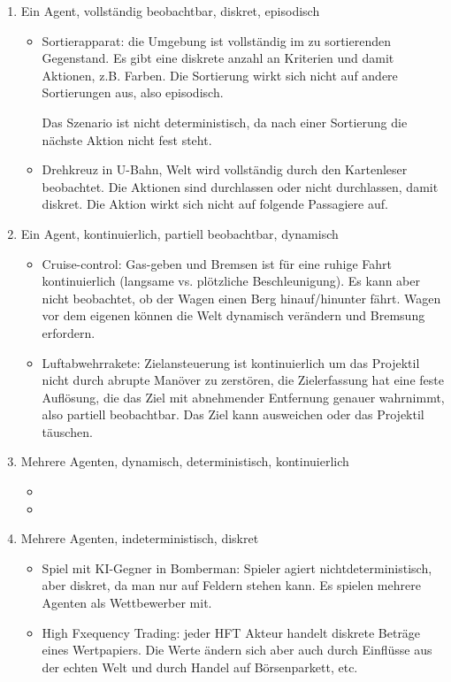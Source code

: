 \begin{enumerate}[label=\alph*)]
	\item Ein Agent, vollständig beobachtbar, diskret, episodisch
	\begin{itemize}
		\item Sortierapparat: die Umgebung ist vollständig im zu sortierenden Gegenstand. Es gibt eine diskrete anzahl an Kriterien und damit Aktionen, z.B. Farben. Die Sortierung wirkt sich nicht auf andere Sortierungen aus, also episodisch.
		
		Das Szenario ist nicht deterministisch, da nach einer Sortierung die nächste Aktion nicht fest steht.
		
		\item Drehkreuz in U-Bahn, Welt wird vollständig durch den Kartenleser beobachtet. Die Aktionen sind durchlassen oder nicht durchlassen, damit diskret. Die Aktion wirkt sich nicht auf folgende Passagiere auf.
	\end{itemize}
	
	\item Ein Agent, kontinuierlich, partiell beobachtbar, dynamisch
	\begin{itemize}
		\item Cruise-control: Gas-geben und Bremsen ist für eine ruhige Fahrt kontinuierlich (langsame vs. plötzliche Beschleunigung). Es kann aber nicht beobachtet, ob der Wagen einen Berg hinauf/hinunter fährt. Wagen vor dem eigenen können die Welt dynamisch verändern und Bremsung erfordern.
		
		\item Luftabwehrrakete: Zielansteuerung ist kontinuierlich um das Projektil nicht durch abrupte Manöver zu zerstören, die Zielerfassung hat eine feste Auflösung, die das Ziel mit abnehmender Entfernung genauer wahrnimmt, also partiell beobachtbar. Das Ziel kann ausweichen oder das Projektil täuschen.
	\end{itemize}
	
	\item Mehrere Agenten, dynamisch, deterministisch, kontinuierlich
	\begin{itemize}
		\item 
		
		\item 
	\end{itemize}
	
	\item Mehrere Agenten, indeterministisch, diskret
	\begin{itemize}
		\item Spiel mit KI-Gegner in Bomberman: Spieler agiert nichtdeterministisch, aber diskret, da man nur auf Feldern stehen kann. Es spielen mehrere Agenten als Wettbewerber mit.
		
		\item High Fxequency Trading: jeder HFT Akteur handelt diskrete Beträge eines Wertpapiers. Die Werte ändern sich aber auch durch Einflüsse aus der echten Welt und durch Handel auf Börsenparkett, etc.
	\end{itemize}
\end{enumerate}